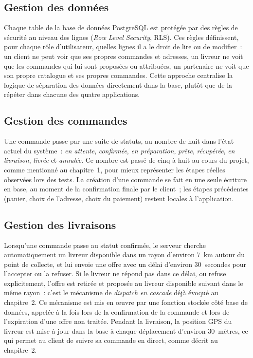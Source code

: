 \documentclass[12pt,fleqn,a4paper]{report}
\begin{document}
\begin{justify}
\subsection{Gestion des données}

Chaque table de la base de données PostgreSQL est protégée par des règles de sécurité au niveau des lignes (\textit{Row Level Security}, RLS). Ces règles définissent, pour chaque rôle d'utilisateur, quelles lignes il a le droit de lire ou de modifier~: un client ne peut voir que ses propres commandes et adresses, un livreur ne voit que les commandes qui lui sont proposées ou attribuées, un partenaire ne voit que son propre catalogue et ses propres commandes. Cette approche centralise la logique de séparation des données directement dans la base, plutôt que de la répéter dans chacune des quatre applications.

\subsection{Gestion des commandes}

Une commande passe par une suite de statuts, au nombre de huit dans l'état actuel du système~: \textit{en attente}, \textit{confirmée}, \textit{en préparation}, \textit{prête}, \textit{récupérée}, \textit{en livraison}, \textit{livrée} et \textit{annulée}. Ce nombre est passé de cinq à huit au cours du projet, comme mentionné au chapitre~1, pour mieux représenter les étapes réelles observées lors des tests. La création d'une commande se fait en une seule écriture en base, au moment de la confirmation finale par le client~; les étapes précédentes (panier, choix de l'adresse, choix du paiement) restent locales à l'application.

\subsection{Gestion des livraisons}

Lorsqu'une commande passe au statut confirmée, le serveur cherche automatiquement un livreur disponible dans un rayon d'environ 7~km autour du point de collecte, et lui envoie une offre avec un délai d'environ 30~secondes pour l'accepter ou la refuser. Si le livreur ne répond pas dans ce délai, ou refuse explicitement, l'offre est retirée et proposée au livreur disponible suivant dans le même rayon~: c'est le mécanisme de \textit{dispatch en cascade} déjà évoqué au chapitre~2. Ce mécanisme est mis en œuvre par une fonction stockée côté base de données, appelée à la fois lors de la confirmation de la commande et lors de l'expiration d'une offre non traitée. Pendant la livraison, la position GPS du livreur est mise à jour dans la base à chaque déplacement d'environ 30~mètres, ce qui permet au client de suivre sa commande en direct, comme décrit au chapitre~2.


\end{justify}
\end{document}
